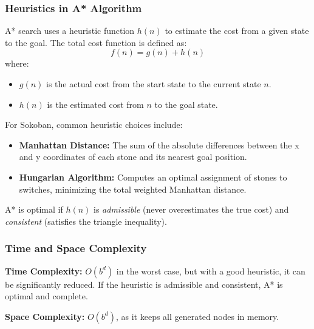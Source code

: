 \subsubsection{Heuristics in A* Algorithm}
A* search uses a heuristic function \( h(n) \) to estimate the cost from a given state to the goal. The total cost function is defined as:
\[
	f(n) = g(n) + h(n)
\]
where:
\begin{itemize}
	\item \( g(n) \) is the actual cost from the start state to the current state \( n \).
	\item \( h(n) \) is the estimated cost from \( n \) to the goal state.
\end{itemize}
For Sokoban, common heuristic choices include:
\begin{itemize}
	\item \textbf{Manhattan Distance:} The sum of the absolute differences between the x and y coordinates of each stone and its nearest goal position.
	\item \textbf{Hungarian Algorithm:} Computes an optimal assignment of stones to switches, minimizing the total weighted Manhattan distance.
\end{itemize}
A* is optimal if \( h(n) \) is \textit{admissible} (never overestimates the true cost) and \textit{consistent} (satisfies the triangle inequality).

\subsubsection{Time and Space Complexity}
\textbf{Time Complexity:} \( O(b^d) \) in the worst case, but with a good heuristic, it can be significantly reduced. If the heuristic is admissible and consistent, A* is optimal and complete.

\textbf{Space Complexity:} \( O(b^d) \), as it keeps all generated nodes in memory.
